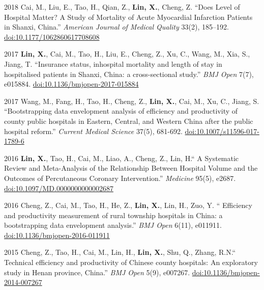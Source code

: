 \documentclass[12pt,letterpaper]{report}
\begin{document}
\begin{tablist}
		\item[2018] \tab Cai, M., Liu, E., Tao, H., Qian, Z., \textbf{Lin, X.}, Cheng, Z. \enquote{Does Level of Hospital Matter? A Study of Mortality of Acute Myocardial Infarction Patients in Shanxi, China.} \textit{American Journal of Medical Quality}  33(2), 185–192. \href{ https://doi.org/10.1177/1062860617708608}{doi:10.1177/1062860617708608}
		
		\item[2017] \tab  \textbf{Lin, X.}, Cai, M., Tao, H., Liu, E., Cheng, Z., Xu, C., Wang, M., Xia, S., Jiang, T. \enquote{Insurance status, inhospital mortality and length of stay in hospitalised patients in Shanxi, China: a cross-sectional study.} \textit{BMJ Open}  7(7), e015884. \href{ https://doi.org/10.1136/bmjopen-2017-015884}{doi:10.1136/bmjopen-2017-015884}
		   
		\item[2017] \tab Wang, M., Fang, H., Tao, H., Cheng, Z., \textbf{Lin, X.}, Cai, M., Xu, C., Jiang, S. \enquote{Bootstrapping data envelopment analysis of efficiency and productivity of county public hospitals in Eastern, Central, and Western China after the public hospital reform.} \textit{Current Medical Science}  37(5), 681-692. \href{ https://doi.org/10.1007/s11596-017-1789-6}{doi:10.1007/s11596-017-1789-6}
    	 
		\item[2016] \tab \textbf{Lin, X.}, Tao, H., Cai, M., Liao, A., Cheng, Z., Lin, H.\enquote{ A Systematic Review and Meta-Analysis of the Relationship Between Hospital Volume and the Outcomes of Percutaneous Coronary Intervention.} \textit{Medicine}  95(5), e2687. \href{ https://doi.org/10.1097/MD.0000000000002687}{doi:10.1097/MD.0000000000002687}
				
		\item[2016] \tab Cheng, Z., Cai, M., Tao, H., He, Z., \textbf{Lin, X.}, Lin, H., Zuo, Y. \enquote{ Efficiency and productivity measurement of rural township hospitals in China: a bootstrapping data envelopment analysis.} \textit{BMJ Open}  6(11), e011911. \href{ https://doi.org/10.1136/bmjopen-2016-011911}{doi:10.1136/bmjopen-2016-011911}
		
		\item[2015] \tab Cheng, Z., Tao, H., Cai, M., Lin, H., \textbf{Lin, X.}, Shu, Q., Zhang, R.N.\enquote{ Technical efficiency and productivity of Chinese county hospitals: An exploratory study in Henan province, China.} \textit{BMJ Open}  5(9), e007267. \href{ https://doi.org/10.1136/bmjopen-2014-007267}{doi:10.1136/bmjopen-2014-007267}

 \end{tablist}
\end{document}

